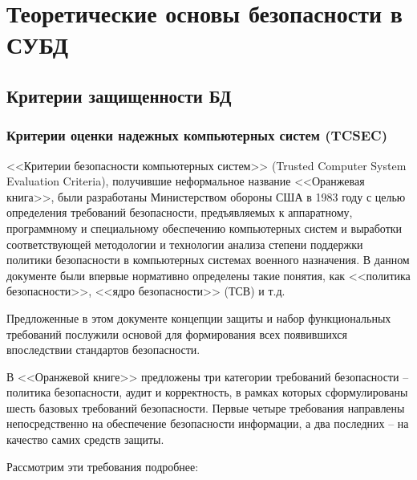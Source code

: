 \section{Теоретические основы безопасности в СУБД}

\subsection{Критерии защищенности БД}

\subsubsection{Критерии оценки надежных компьютерных систем (TCSEC)}
<<Критерии безопасности компьютерных систем>> (Trusted Computer System Evaluation Criteria), получившие неформальное название <<Оранжевая книга>>, были разработаны Министерством обороны США в 1983 году с целью определения требований безопасности, предъявляемых к аппаратному, программному и специальному обеспечению компьютерных систем и выработки соответствующей методологии и технологии анализа степени поддержки политики безопасности в компьютерных системах военного назначения. В данном документе были впервые нормативно определены такие понятия, как <<политика безопасности>>, <<ядро безопасности>> (ТСВ) и т.д.

Предложенные в этом документе концепции защиты и набор функциональных требований послужили основой для формирования всех появившихся впоследствии стандартов безопасности.

В <<Оранжевой книге>> предложены три категории требований безопасности -- политика безопасности, аудит и корректность, в рамках которых сформулированы шесть базовых требований безопасности. Первые четыре требования направлены непосредственно на обеспечение безопасности информации, а два последних -- на качество самих средств защиты.

Рассмотрим эти требования подробнее:

